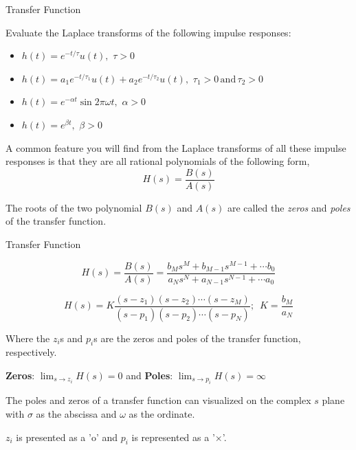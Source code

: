 \documentclass{beamer}
\begin{document}
\begin{frame}{Transfer Function}

Evaluate the Laplace transforms of the following impulse responses:
\begin{itemize}
\item $h(t) = e^{-t/\tau} u(t), \,\, \tau > 0$
\item $h(t) = a_1e^{-t/\tau_1}u(t) + a_2e^{-t/\tau_2}u(t), \,\, \tau_1 > 0 \, \text{and} \, \tau_2 > 0$
\item $h(t) = e^{-\alpha t}\sin 2\pi\omega t, \,\, \alpha > 0$
\item $h(t) = e^{\beta t}, \,\, \beta > 0 $
\end{itemize}

A common feature you will find from the Laplace transforms of all these impulse responses is that they are all rational polynomials of the following form,
\[ H(s) = \frac{B(s)}{A(s)} \]

The roots of the two polynomial $B(s)$ and $A(s)$ are called the \textit{zeros} and \textit{poles} of the transfer function.
\end{frame}

\begin{frame}{Transfer Function}

\[ H(s) = \frac{B(s)}{A(s)} = \frac{b_Ms^M + b_{M-1}s^{M-1} + \cdots b_0}{a_Ns^N + a_{N-1}s^{N-1} + \cdots a_0}\]

\[ H(s) = K\frac{\left(s - z_1\right)\left(s - z_2\right)\cdots\left(s - z_M\right)}{\left(s - p_1\right)\left(s - p_2\right)\cdots\left(s - p_N\right)}; \,\,\, K=\frac{b_M}{a_N}\]

Where the $z_i$s and $p_i$s are the zeros and poles of the transfer function, respectively.
\vspace{5mm}

\textbf{Zeros}: $\lim_{s \to z_i} H(s) = 0$ and \textbf{Poles}: $\lim_{s \to p_i} H(s) = \infty$
\vspace{5mm}

The poles and zeros of a transfer function can visualized on the complex $s$ plane with $\sigma$ as the abscissa and $\omega$ as the ordinate.
\vspace{5mm}

$z_i$ is presented as a '$\text{o}$' and $p_i$ is represented as a '$\times$'.
\end{frame}
\end{document}
